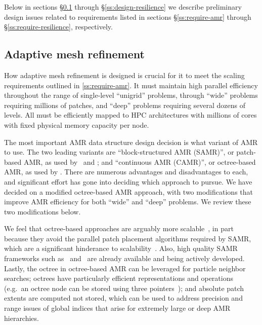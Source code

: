 \documentclass[10pt]{article}
\begin{document}
Below in sections \S\ref{ss:design-amr} through
\S\ref{ss:design-resilience} we describe preliminary design issues
related to requirements listed in sections \S\ref{ss:require-amr}
through \S\ref{ss:require-resilience}, respectively.

\subsection{Adaptive mesh refinement} \label{ss:design-amr}

How adaptive mesh refinement is designed is crucial for it to meet the
scaling requirements outlined in \ref{ss:require-amr}.  It must
maintain high parallel efficiency throughout the range of single-level
``unigrid'' problems, through ``wide'' problems requiring millions of
patches, and ``deep'' problems requiring several dozens of levels.
All must be efficiently mapped to HPC architectures with millions of
cores with fixed physical memory capacity per node.

The most important AMR data structure design decision is what variant
of AMR to use.  The two leading variants are ``block-structured AMR
(SAMR)'', or patch-based AMR, as used by \samrai\ and \chombo; and
``continuous AMR (CAMR)'', or octree-based AMR, as used by \paramesh.
There are numerous advantages and disadvantages to each, and
significant effort has gone into deciding which approach to pursue.
We have decided on a modified octree-based AMR approach, with two
modifications that improve AMR efficiency for both ``wide'' and
``deep'' problems.  We review these two modifications below.

We feel that octree-based approaches are arguably more
scalable~\cite{BuGh08}, in part because they avoid the parallel patch
placement algorithms required by SAMR, which are a significant
hinderance to scalability~\cite{GuWi06}.  Also, high quality SAMR
frameworks such as \chombo\ and \samrai\ are already available and
being actively developed.  Lastly, the octree in octree-based AMR can
be leveraged for particle neighbor searches; octrees have particularly
efficient representations and operations (e.g.~an octree node can be
stored using three pointers~\cite{@@@octree}); and absolute patch
extents are computed not stored, which can be used to address
precision and range issues of global indices that arise for extremely
large or deep AMR hierarchies.
\end{document}

